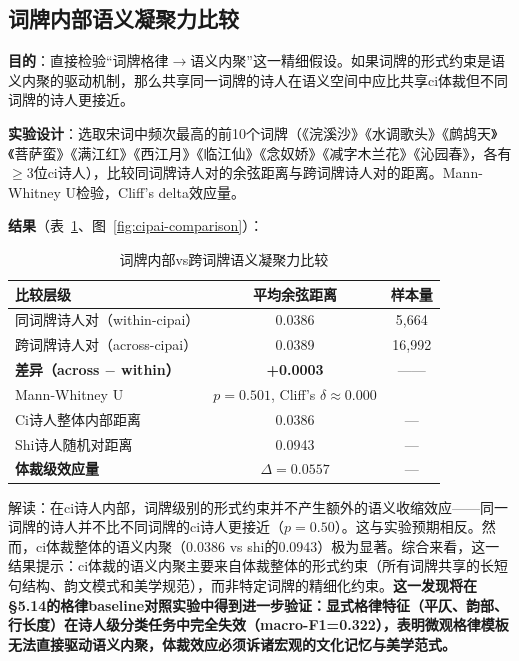 \documentclass[12pt,a4paper]{article}
\numberwithin{equation}{section}
\begin{document}
\subsection{词牌内部语义凝聚力比较}
\label{sec:cipai}

\textbf{目的}：直接检验“词牌格律$\to$语义内聚”这一精细假设。如果词牌的形式约束是语义内聚的驱动机制，那么共享同一词牌的诗人在语义空间中应比共享ci体裁但不同词牌的诗人更接近。

\textbf{实验设计}：选取宋词中频次最高的前10个词牌（《浣溪沙》《水调歌头》《鹧鸪天》《菩萨蛮》《满江红》《西江月》《临江仙》《念奴娇》《减字木兰花》《沁园春》，各有$\ge$3位ci诗人），比较同词牌诗人对的余弦距离与跨词牌诗人对的距离。Mann-Whitney U检验，Cliff's delta效应量。

\textbf{结果}（表~\ref{tab:cipai-results}、图~\ref{fig:cipai-comparison}）：

\begin{table}[htbp]
  \centering
  \caption{词牌内部vs跨词牌语义凝聚力比较}
  \label{tab:cipai-results}
  \begin{tabular}{lcc}
    \toprule
    比较层级 & 平均余弦距离 & 样本量 \\
    \midrule
    同词牌诗人对（within-cipai）       & 0.0386 & 5,664 \\
    跨词牌诗人对（across-cipai）       & 0.0389 & 16,992 \\
    \textbf{差异（across $-$ within）} & \textbf{+0.0003} & —— \\
    \midrule
    Mann-Whitney U                    & $p=0.501$, Cliff's $\delta\approx 0.000$ \\
    \midrule
    Ci诗人整体内部距离                & 0.0386 & — \\
    Shi诗人随机对距离                 & 0.0943 & — \\
    \textbf{体裁级效应量}              & $\Delta = 0.0557$ & — \\
    \bottomrule
  \end{tabular}
\end{table}

解读：在ci诗人内部，词牌级别的形式约束并不产生额外的语义收缩效应——同一词牌的诗人并不比不同词牌的ci诗人更接近（$p=0.50$）。这与实验预期相反。然而，ci体裁整体的语义内聚（0.0386 vs shi的0.0943）极为显著。综合来看，这一结果提示：ci体裁的语义内聚主要来自体裁整体的形式约束（所有词牌共享的长短句结构、韵文模式和美学规范），而非特定词牌的精细化约束。\textbf{这一发现将在§5.14的格律baseline对照实验中得到进一步验证：显式格律特征（平仄、韵部、行长度）在诗人级分类任务中完全失效（macro-F1=0.322），表明微观格律模板无法直接驱动语义内聚，体裁效应必须诉诸宏观的文化记忆与美学范式。}
\end{document}
